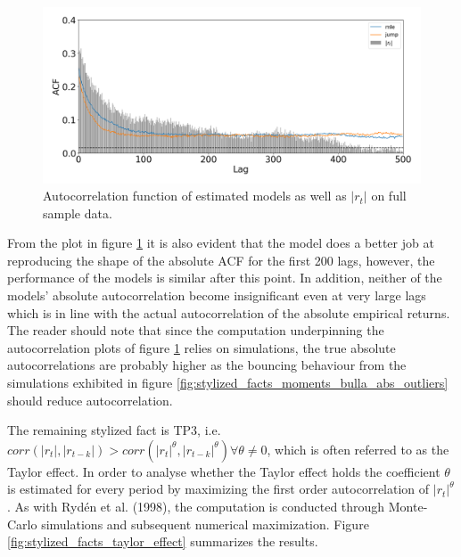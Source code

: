 \begin{figure}[H] 
    \centering
    \includegraphics[width=1.0\textwidth]{analysis/stylized_facts/images/acf_abs.png}
    \caption[Autocorrelation function of estimated models as well as $|r_t|$ on full sample data]{Autocorrelation function of estimated models as well as $|r_t|$ on full sample data.}
    \label{fig:stylized_facts_acf_plots} 
\end{figure}

From the plot in figure \ref{fig:stylized_facts_acf_plots} it is also evident that the \mle model does a better job at reproducing the shape of the absolute ACF for the first 200 lags, however, the performance of the models is similar after this point. In addition, neither of the models' absolute autocorrelation become insignificant even at very large lags which is in line with the actual autocorrelation of the absolute empirical returns. The reader should note that since the computation underpinning the autocorrelation plots of figure \ref{fig:stylized_facts_acf_plots} relies on simulations, the true absolute autocorrelations are probably higher as the bouncing behaviour from the simulations exhibited in figure \ref{fig:stylized_facts_moments_bulla_abs_outliers} should reduce autocorrelation.

The remaining stylized fact is TP3, i.e. $corr(|r_t|, |r_{t-k}|) > corr(|r_t|^{\theta}, |r_{t-k}|^{\theta}) \forall \theta \neq 0$, which is often referred to as the Taylor effect. In order to analyse whether the Taylor effect holds the coefficient $\theta$ is estimated for every period by maximizing the first order autocorrelation of $|r_t|^{\theta}$. As with Rydén et al. (1998), the computation is conducted through Monte-Carlo simulations and subsequent numerical maximization. Figure \ref{fig:stylized_facts_taylor_effect} summarizes the results.

